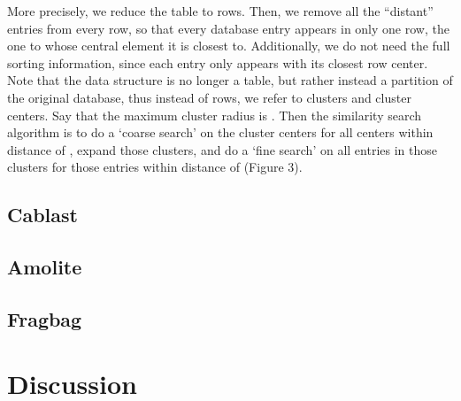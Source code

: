 \documentclass{amsbook}
\theoremstyle{definition}
\theoremstyle{remark}
\numberwithin{equation}{section}
\begin{document}
More precisely, we reduce the table to  rows.
Then, we remove all the “distant” entries from every row, so that every database entry appears in only one row, the one to whose central element it is closest to.
Additionally, we do not need the full sorting information, since each entry only appears with its closest row center.
Note that the data structure is no longer a table, but rather instead a partition of the original database, thus instead of rows, we refer to clusters and cluster centers.
Say that the maximum cluster radius is .
Then the similarity search algorithm is to do a ‘coarse search’ on the cluster centers for all centers within distance  of , expand those clusters, and do a ‘fine search’ on all entries in those clusters for those entries within distance  of  (Figure 3).

\section{Cablast}

\section{Amolite}

\section{Fragbag}

\chapter{Discussion}




\end{document}
